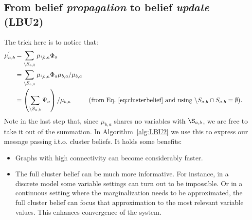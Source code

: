 \documentclass[oneside,english]{scrbook}
\begin{document}
\subsection{From belief \emph{propagation} to belief \emph{update} (LBU2)}
The trick here is to notice that:
\begin{align}
  \mu^{'}_{a,b} &= \sum_{\backslash S_{a,b}} \mu_{\backslash b,a}\Phi_a \nonumber \\
  &= \sum_{\backslash S_{a,b}} \mu_{\backslash b,a}\Phi_a \mu_{b,a}/\mu_{b,a} \nonumber \\
  &= \left(\sum_{\backslash S_{a,b}} \Psi_a\right)/\mu_{b,a}
  && \text{(from Eq.~\ref{eq:clusterbelief} and using $\backslash S_{a,b}\cap S_{a,b} = \emptyset$)}.  \nonumber
\end{align}
Note in the last step that, since $\mu_{b,a}$ shares no variables with
$\S_{a,b}$, we are free to take it out of the summation. In
Algorithm~\ref{alg:LBU2} we use this to express our message passing
i.t.o. cluster beliefs. It holds some benefits:

\begin{itemize}
\item Graphs with high connectivity can become considerably faster.
\item The full cluster belief can be much more informative. For
  instance, in a discrete model some variable settings can turn out to
  be impossible. Or in a continuous setting where the marginalization
  needs to be approximated, the full cluster belief can focus that
  approximation to the most relevant variable values. This enhances
  convergence of the system.
\end{itemize}
\end{document}
